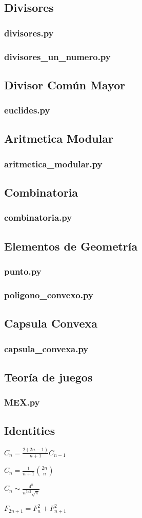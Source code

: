 \documentclass{article}
\newcommand\codefile[2]{    
    \subsubsection{#2}
    
    
}
\begin{document}
\begin{multicols*}{2}
\subsection{Divisores}
\codefile{matematicas/divisores.py}{divisores.py}
\codefile{matematicas/divisores_un_numero.py}{divisores\_un\_numero.py}

\subsection{Divisor Común Mayor}
\codefile{matematicas/euclides.py}{euclides.py}

\subsection{Aritmetica Modular}
\codefile{matematicas/aritmetica_modular.py}{aritmetica\_modular.py}

\subsection{Combinatoria}
\codefile{matematicas/combinatoria.py}{combinatoria.py}

\subsection{Elementos de Geometría}
\codefile{matematicas/punto.py}{punto.py}
\codefile{matematicas/poligono_convexo.py}{poligono\_convexo.py}

\subsection{Capsula Convexa}
\codefile{matematicas/capsula_convexa.py}{capsula\_convexa.py}

\subsection{Teoría de juegos}
\codefile{matematicas/MEX.py}{MEX.py}

\subsection{Identities}
    $C_n = \frac{2(2n-1)}{n+1} C_{n-1}$

    $C_n = \frac{1}{n+1} \binom{2n}{n}$

    $C_n \sim \frac{4^n}{n^{3/2}\sqrt{\pi}}$

    $F_{2n+1} = F_{n}^2 + F_{n+1}^2$


\end{multicols*}
\end{document}
